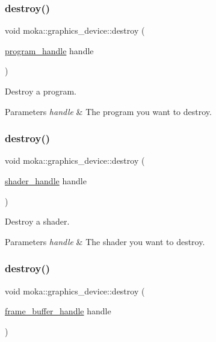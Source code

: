 \subsubsection{\texorpdfstring{destroy()}{destroy()}\hspace{0.1cm}{\footnotesize\ttfamily [1/5]}}
{\footnotesize\ttfamily void moka\+::graphics\+\_\+device\+::destroy (\begin{DoxyParamCaption}\item[{\mbox{\hyperlink{structmoka_1_1program__handle}{program\+\_\+handle}}}]{handle }\end{DoxyParamCaption})}



Destroy a program. 


\begin{DoxyParams}{Parameters}
{\em handle} & The program you want to destroy. \\
\hline
\end{DoxyParams}
\mbox{\label{classmoka_1_1graphics__device_a5a2edb22b62d5378b3f047b7394862f8}} 
\subsubsection{\texorpdfstring{destroy()}{destroy()}\hspace{0.1cm}{\footnotesize\ttfamily [2/5]}}
{\footnotesize\ttfamily void moka\+::graphics\+\_\+device\+::destroy (\begin{DoxyParamCaption}\item[{\mbox{\hyperlink{structmoka_1_1shader__handle}{shader\+\_\+handle}}}]{handle }\end{DoxyParamCaption})}



Destroy a shader. 


\begin{DoxyParams}{Parameters}
{\em handle} & The shader you want to destroy. \\
\hline
\end{DoxyParams}
\mbox{\label{classmoka_1_1graphics__device_a3ff2b807e523d39be79cc333c7327c63}} 
\subsubsection{\texorpdfstring{destroy()}{destroy()}\hspace{0.1cm}{\footnotesize\ttfamily [3/5]}}
{\footnotesize\ttfamily void moka\+::graphics\+\_\+device\+::destroy (\begin{DoxyParamCaption}\item[{\mbox{\hyperlink{structmoka_1_1frame__buffer__handle}{frame\+\_\+buffer\+\_\+handle}}}]{handle }\end{DoxyParamCaption})}



